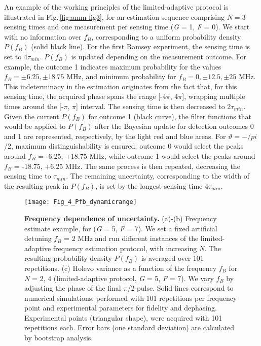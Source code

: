 An example of the working principles of the limited-adaptive protocol is illustrated in Fig.\,\ref{fig:amm-fig3}, for an estimation sequence comprising $N = 3$ sensing times and one measurement per sensing time (\textit{G} = 1, \textit{F} = 0). We start with no information over $f_B$, corresponding to a uniform probability density $P(f_B )$ (solid black line).  For the first Ramsey experiment, the sensing time is set to $4 \tau_{min}$. $P(f_B)$ is updated depending on the measurement outcome. For example, the outcome 1 indicates maximum probability for the values $f_B = \pm 6.25, \pm 18.75$ MHz, and minimum probability for $f_B = 0, \pm 12.5, \pm 25$ MHz. This indeterminacy in the estimation originates from the fact that, for this sensing time, the acquired phase spans the range [-4$\pi$, 4$\pi$], wrapping multiple times around the [-$\pi$, $\pi$] interval. The sensing time is then decreased to $2 \tau_{min}$. Given the current $P(f_B)$ for outcome 1 (black curve), the filter functions that would be applied to $P(f_B)$ after the Bayesian update for detection outcomes 0 and 1 are represented, respectively, by the light red and blue areas. For $\vartheta = - /pi$/2, maximum distinguishability is ensured: outcome 0 would select the peaks around $f_B$ = -6.25, +18.75 MHz, while outcome 1 would select the peaks around $f_B$ = -18.75, +6.25 MHz. The same process is then repeated, decreasing the sensing time to  $\tau_{min}$. The remaining uncertainty, corresponding to the width of the resulting peak in $P(f_B)$, is set by the longest sensing time $4 \tau_{min}$. 

\begin{figure*}
	\centering
	\texttt{[image: Fig\_4\_Pfb\_dynamicrange]}
	\caption{\label{fig:amm-fig4} \textbf{Frequency dependence of uncertainty.} (a)-(b) Frequency estimate example, for (\textit{G} =  5, \textit{F} = 7). We set a fixed artificial detuning $f_B$ = 2 MHz and run different instances of the limited-adaptive frequency estimation protocol, with increasing \textit{N}. The resulting probability density $P(f_B)$ is averaged over 101 repetitions. (c) Holevo variance as a function of the frequency $f_B$ for \textit{N} = 2, 4 (limited-adaptive protocol, \textit{G} = 5, \textit{F} = 7). We vary $f_B$ by adjusting the phase of the final $\pi$/2-pulse. Solid lines correspond to numerical simulations, performed with 101 repetitions per frequency point and experimental parameters for fidelity and dephasing. Experimental points (triangular shape), were acquired with 101 repetitions each. Error bars (one standard deviation) are calculated by bootstrap analysis.}
\end{figure*}

